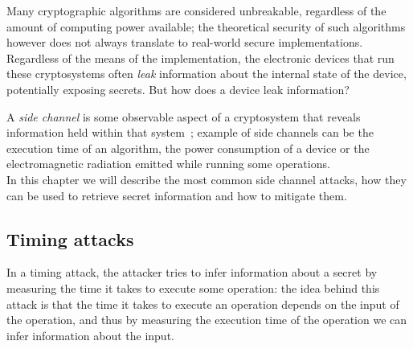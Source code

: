Many cryptographic algorithms are considered unbreakable, regardless of the amount of computing power available;
the theoretical security of such algorithms however does not always translate to real-world secure implementations.\\
Regardless of the means of the implementation, the electronic devices that run these cryptosystems often
\textit{leak} information about the internal state of the device, potentially exposing secrets.
But how does a device leak information?

A \textit{side channel} is some observable aspect of a cryptosystem that reveals information held within that system~\cite{DBLP:conf/crypto/Kocher96, DBLP:books/sp/10/Standaert10};
example of side channels can be the execution time of an algorithm, the power consumption of a device or the electromagnetic
radiation emitted while running some operations.\\
In this chapter we will describe the most common side channel attacks, how they can be used to retrieve secret information and
how to mitigate them.

\subsection{Timing attacks}
In a timing attack, the attacker tries to infer information about a secret by measuring the time it takes to execute some operation:
the idea behind this attack is that the time it takes to execute an operation depends on the input of the operation, and thus
by measuring the execution time of the operation we can infer information about the input.

